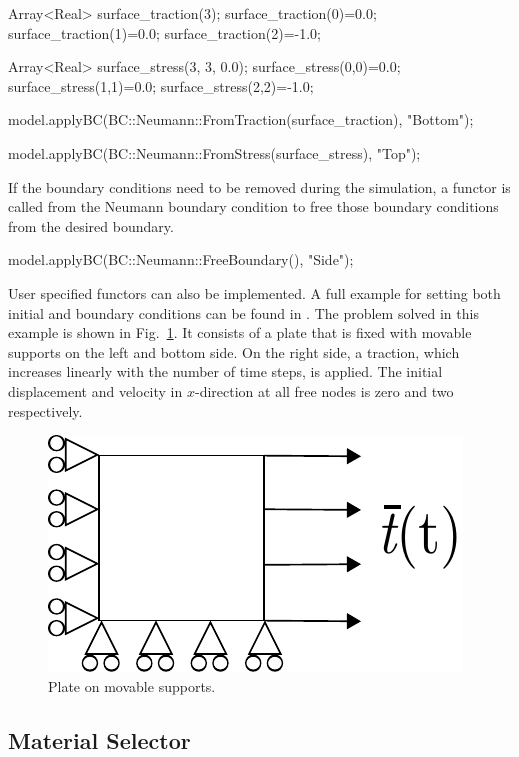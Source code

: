 \begin{cpp}
Array<Real> surface_traction(3);
surface_traction(0)=0.0;
surface_traction(1)=0.0;
surface_traction(2)=-1.0;

Array<Real> surface_stress(3, 3, 0.0);
surface_stress(0,0)=0.0;
surface_stress(1,1)=0.0;
surface_stress(2,2)=-1.0;

model.applyBC(BC::Neumann::FromTraction(surface_traction), "Bottom");

model.applyBC(BC::Neumann::FromStress(surface_stress), "Top");
\end{cpp}

If the boundary conditions need to be removed during the simulation, a
functor is called from the Neumann boundary condition to free those
boundary conditions from the desired boundary.

\begin{cpp}
 model.applyBC(BC::Neumann::FreeBoundary(), "Side");
\end{cpp}

User specified functors can also be implemented.  A full example for
setting both initial and boundary conditions can be found in
.  The problem solved
in this example is shown in Fig.~\ref{fig:smm:bc_and_ic}. It consists
of a plate that is fixed with movable supports on the left and bottom
side. On the right side, a traction, which increases linearly with the
number of time steps, is applied. The initial displacement and
velocity in $x$-direction at all free nodes is zero and two
respectively.
\begin{figure}[!htb]
  \centering
  \includegraphics[scale=0.8]{figures/bc_and_ic_example}
  \caption{Plate on movable supports.\label{fig:smm:bc_and_ic}}
\end{figure}

\subsection{Material Selector\label{sect:smm:materialselector}}


